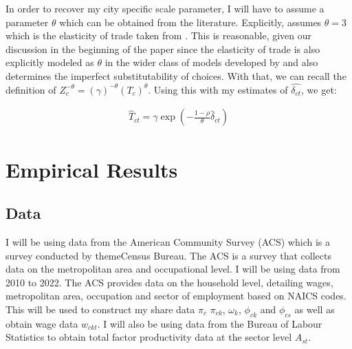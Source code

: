 \documentclass[10pt]{article}
\begin{document}




In order to recover my city specific scale parameter, I will have to assume a parameter $\theta$ which can be obtained from the literature. Explicitly, \cite{redding} assumes $\theta = 3$ which is the elasticity of trade taken from \cite{acm2010}. This is reasonable, given our discussion in the beginning of the paper since the elasticity of trade is also explicitly modeled as $\theta$ in the wider class of models developed by \cite{ek} and also determines the imperfect substitutability of choices. With that, we can recall the definition of $Z_c^{- \theta} = (\gamma)^{- \theta} (T_c)^{\theta}$. Using this with my estimates of $\hat{\delta_{ct}}$, we get:

\begin{align*}
    \hat{T}_{ct} = \gamma \exp \left( - \frac{1 - \rho}{\theta} \hat{\delta}_{ct} \right)
\end{align*}

\section{Empirical Results}

\subsection{Data}

I will be using data from the American Community Survey (ACS) which is a survey conducted by themeCensus Bureau. The ACS is a survey that collects data on the metropolitan area and occupational level. I will be using data from 2010 to 2022. The ACS provides data on the household level, detailing wages, metropolitan area, occupation and sector of employment based on NAICS codes. This will be used to construct my share data $\pi_c$ $\pi_{ck}$, $\omega_k$, $\phi_{ck}$ and $\phi_{cs}$ as well as obtain wage data $w_{ckt}$. I will also be using data from the Bureau of Labour Statistics to obtain total factor productivity data at the sector level $A_{st}$.
\end{document}
